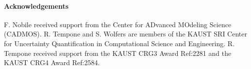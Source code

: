 \paragraph{Acknowledgements} F. Nobile received support from the Center for ADvanced MOdeling Science (CADMOS). R. Tempone and S. Wolfers are members of the KAUST SRI Center for Uncertainty Quantification in Computational Science and Engineering. R. Tempone received support from the KAUST CRG3 Award Ref:2281 and the KAUST CRG4 Award Ref:2584.

